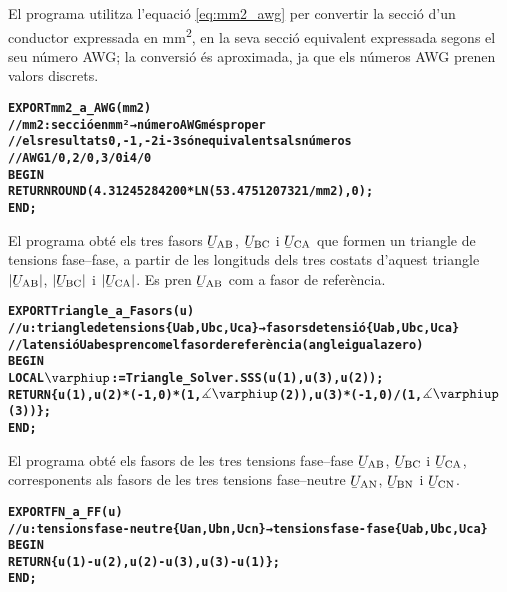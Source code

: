 El programa  utilitza l'equació \eqref{eq:mm2_awg} per convertir la secció d'un conductor expressada en \unit{mm^2}, en la seva secció equivalent expressada segons el seu número AWG; la conversió és aproximada, ja que els números AWG prenen valors discrets.
\vspace{-1cm}
\begin{alltt}
\bfseries
{}
    EXPORT mm2_a_AWG(mm2)
    // mm2:secció en mm² → número AWG més proper
    // els resultats 0, -1, -2 i -3 són equivalents als números
    // AWG 1/0, 2/0, 3/0 i 4/0
    BEGIN
      RETURN ROUND(4.31245284200*LN(53.4751207321/mm2),0);
    END;
\end{alltt}


El programa  obté els tres fasors $\cmplx{U}\ped{AB}$, $\cmplx{U}\ped{BC}$ i $\cmplx{U}\ped{CA}$ que formen un triangle de tensions fase--fase, a partir de les longituds dels tres costats d'aquest triangle $|\cmplx{U}\ped{AB}|$, $|\cmplx{U}\ped{BC}|$ i $|\cmplx{U}\ped{CA}|$. Es pren $\cmplx{U}\ped{AB}$ com a fasor de referència.
\vspace{-1cm}
\begin{alltt}
\bfseries
{}
    EXPORT Triangle_a_Fasors(u)
    // u:triangle de tensions \{Uab,Ubc,Uca\} → fasors de tensió \{Uab,Ubc,Uca\}
    // la tensió Uab es pren com el fasor de referència (angle igual a zero)
    BEGIN
      LOCAL \(\varphiup\):=Triangle_Solver.SSS(u(1),u(3),u(2));
      RETURN \{u(1),u(2)*(-1,0)*(1,\(\measuredangle\varphiup\)(2)),u(3)*(-1,0)/(1,\(\measuredangle\varphiup\)(3))\};
    END;
\end{alltt}

El programa  obté els fasors de les tres tensions fase--fase $\cmplx{U}\ped{AB}$, $\cmplx{U}\ped{BC}$ i $\cmplx{U}\ped{CA}$, corresponents als fasors de les tres tensions fase--neutre
$\cmplx{U}\ped{AN}$, $\cmplx{U}\ped{BN}$ i $\cmplx{U}\ped{CN}$.
\vspace{-1cm}
\begin{alltt}
\bfseries
{}
    EXPORT FN_a_FF(u)
    // u:tensions fase-neutre \{Uan,Ubn,Ucn\} → tensions fase-fase \{Uab,Ubc,Uca\}
    BEGIN
      RETURN \{u(1)-u(2),u(2)-u(3),u(3)-u(1)\};
    END;
\end{alltt}

